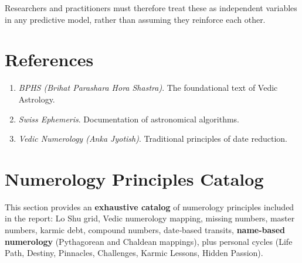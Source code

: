 \documentclass[
  american,
  11pt,
  oneside,
  openany]{article}
\providecommand{\tightlist}{%
  \setlength{\itemsep}{0pt}\setlength{\parskip}{0pt}}
\begin{document}
Researchers and practitioners must therefore treat these as independent
variables in any predictive model, rather than assuming they reinforce
each other.

\section{References}\label{references}

\begin{enumerate}
\def\labelenumi{\arabic{enumi}.}
\tightlist
\item
  \emph{BPHS (Brihat Parashara Hora Shastra)}. The foundational text of
  Vedic Astrology.
\item
  \emph{Swiss Ephemeris}. Documentation of astronomical algorithms.
\item
  \emph{Vedic Numerology (Anka Jyotish)}. Traditional principles of date
  reduction.
\end{enumerate}

\section{Numerology Principles
Catalog}\label{numerology-principles-catalog}

This section provides an \textbf{exhaustive catalog} of numerology
principles included in the report: Lo Shu grid, Vedic numerology
mapping, missing numbers, master numbers, karmic debt, compound numbers,
date‑based transits, \textbf{name-based numerology} (Pythagorean and
Chaldean mappings), plus personal cycles (Life Path, Destiny, Pinnacles,
Challenges, Karmic Lessons, Hidden Passion).
\end{document}
